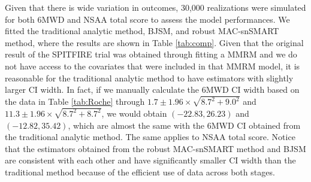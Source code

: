 Given that there is wide variation in outcomes, 30,000 realizations were simulated for both \ac{6MWD} and \ac{NSAA} total score to assess the model performances. We fitted the traditional analytic method, \ac{BJSM}, and robust \ac{MAC}-snSMART method, where the results are shown in Table \ref{tab:comp}. Given that the original result of the SPITFIRE trial was obtained through fitting a \ac{MMRM} and we do not have access to the covariates that were included in that \ac{MMRM} model, it is reasonable for the traditional analytic method to have estimators with slightly larger \ac{CI} width. In fact, if we manually calculate the \ac{6MWD} \ac{CI} width based on the data in Table \ref{tab:Roche} through $1.7 \pm 1.96 \times \sqrt{8.7^2 + 9.0^2}$ and $11.3 \pm 1.96 \times \sqrt{8.7^2 + 8.7^2}$, we would obtain $(-22.83, 26.23)$ and $(-12.82, 35.42)$, which are almost the same with the \ac{6MWD} \ac{CI} obtained from the traditional analytic method. The same applies to \ac{NSAA} total score. Notice that the estimators obtained from the robust \ac{MAC}-snSMART method and \ac{BJSM} are consistent with each other and have significantly smaller \ac{CI} width than the traditional method because of the efficient use of data across both stages. 

